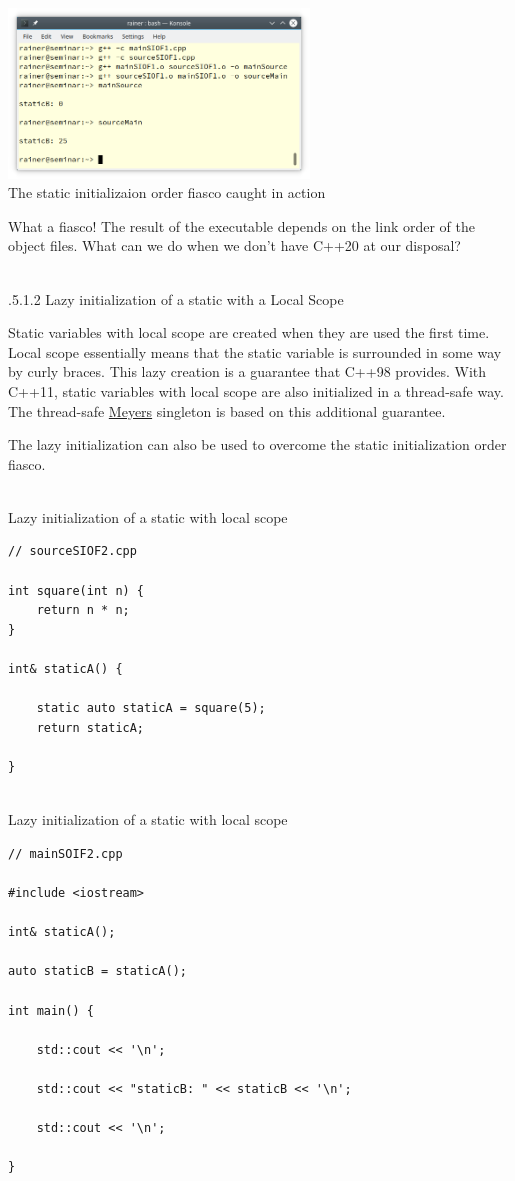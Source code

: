 \begin{center}
\includegraphics[width=0.6\textwidth]{content/3/chapter4/images/37.png}\\
The static initializaion order fiasco caught in action
\end{center}

What a fiasco! The result of the executable depends on the link order of the object files. What can we do when we don’t have C++20 at our disposal?

\hspace*{\fill} \\ %
.5.1.2\hspace{0.2cm} Lazy initialization of a static with a Local Scope

Static variables with local scope are created when they are used the first time. Local scope essentially means that the static variable is surrounded in some way by curly braces. This lazy creation is a guarantee that C++98 provides. With C++11, static variables with local scope are also initialized in a thread-safe way. The thread-safe \href{https://en.wikipedia.org/wiki/Scott_Meyers}{Meyers} singleton is based on this additional guarantee.

The lazy initialization can also be used to overcome the static initialization order fiasco.

\hspace*{\fill} \\ %
\noindent
Lazy initialization of a static with local scope
\begin{lstlisting}[style=styleCXX]
// sourceSIOF2.cpp

int square(int n) {
	return n * n;
}

int& staticA() {
	
	static auto staticA = square(5);
	return staticA;

}
\end{lstlisting}

\hspace*{\fill} \\ %
\noindent
Lazy initialization of a static with local scope
\begin{lstlisting}[style=styleCXX]
// mainSOIF2.cpp

#include <iostream>

int& staticA();

auto staticB = staticA();

int main() {
	
	std::cout << '\n';
	
	std::cout << "staticB: " << staticB << '\n';
	
	std::cout << '\n';

}
\end{lstlisting}

